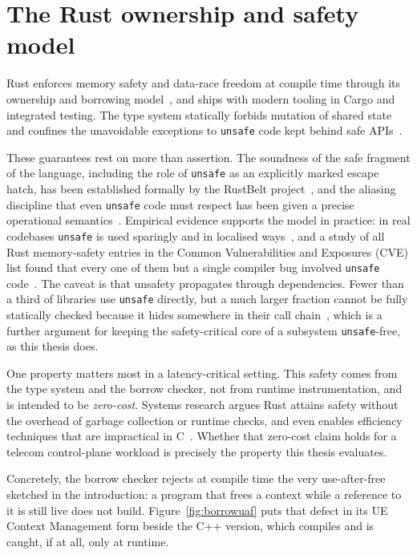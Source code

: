 \documentclass[english,oneside,a4paper,censored,csm,software-track-2020]{HYthesisML}
\begin{document}
\section{The Rust ownership and safety model}
Rust enforces memory safety and data-race freedom at compile time through its ownership and
borrowing model~\cite{klabnik2023rust}, and ships with modern tooling in Cargo and integrated
testing. The type system statically forbids mutation of shared state and confines the
unavoidable exceptions to \texttt{unsafe} code kept behind safe APIs~\cite{jung2021safe}.

These guarantees rest on more than assertion. The soundness of the safe fragment of the
language, including the role of \texttt{unsafe} as an explicitly marked escape hatch, has
been established formally by the RustBelt project~\cite{jung2018rustbelt}, and the aliasing
discipline that even \texttt{unsafe} code must respect has been given a precise operational
semantics~\cite{jung2020stacked}. Empirical evidence supports the model in practice: in real
codebases \texttt{unsafe} is used sparingly and in localised
ways~\cite{qin2020rust,astrauskas2020unsafe}, and a study of all Rust memory-safety entries in
the Common Vulnerabilities and Exposures (CVE) list found
that every one of them but a single compiler bug involved \texttt{unsafe}
code~\cite{xu2021rustcve}. The caveat is that unsafety propagates through dependencies. Fewer
than a third of libraries use \texttt{unsafe} directly, but a much larger fraction cannot be
fully statically checked because it hides somewhere in their call
chain~\cite{evans2020rust}, which is a further argument for keeping the safety-critical core of a
subsystem \texttt{unsafe}-free, as this thesis does.

One property matters most in a latency-critical setting. This safety comes from the type system
and the borrow checker, not from runtime instrumentation, and is intended to be
\emph{zero-cost}. Systems research argues Rust attains safety without the overhead of garbage
collection or runtime checks, and even enables efficiency techniques that are impractical in
C~\cite{balasubramanian2017rust}. Whether that zero-cost claim holds for a telecom
control-plane workload is precisely the property this thesis evaluates.

Concretely, the borrow checker rejects at compile time the very use-after-free sketched in the
introduction: a program that frees a context while a reference to it is still live does not
build. Figure~\ref{fig:borrowuaf} puts that defect in its UE Context Management form beside the
C++ version, which compiles and is caught, if at all, only at runtime.
\end{document}
